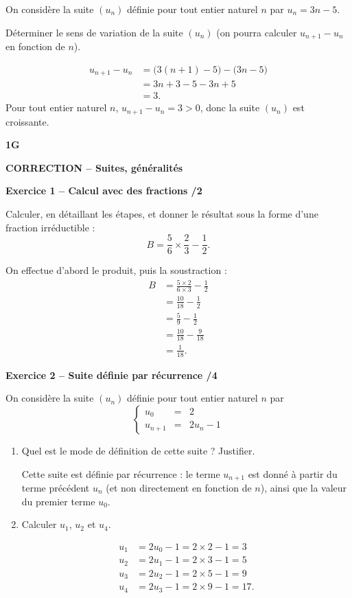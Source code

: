 \documentclass[10pt,a4paper]{article}
\renewcommand{\niveau}{1G}
\renewcommand{\chapitre}{Suites, généralités}
\renewcommand{\interroversion}[1]{
    \noindent\textbf{\niveau}

    \vspace{-0.5cm}
    \begin{center}
        \textbf{\large CORRECTION -- \chapitre}
    \end{center}

    \vspace{0.1cm}
}
\begin{document}
On considère la suite \((u_n)\) définie pour tout entier naturel \(n\) par \(u_n=3n-5\).

Déterminer le sens de variation de la suite \((u_n)\) (on pourra calculer \(u_{n+1}-u_n\) en fonction de \(n\)).

\[
\begin{aligned}
u_{n+1}-u_n &= \bigl(3(n+1)-5\bigr)-\bigl(3n-5\bigr)\\
            &= 3n+3-5-3n+5\\
            &= 3.
\end{aligned}
\]
Pour tout entier naturel \(n\), \(u_{n+1}-u_n=3>0\), donc la suite \((u_n)\) est croissante.

\newpage


\interroversion{B}

\textbf{Exercice 1 -- Calcul avec des fractions \hfill /2}

Calculer, en détaillant les étapes, et donner le résultat sous la forme d'une fraction irréductible :
\[
B = \frac{5}{6}\times\frac{2}{3}-\frac{1}{2}.
\]

On effectue d'abord le produit, puis la soustraction :
\[
\begin{aligned}
B &= \frac{5\times2}{6\times3}-\frac{1}{2}\\
  &= \frac{10}{18}-\frac{1}{2}\\
  &= \frac{5}{9}-\frac{1}{2}\\
  &= \frac{10}{18}-\frac{9}{18}\\
  &= \frac{1}{18}.
\end{aligned}
\]

\textbf{Exercice 2 -- Suite définie par récurrence \hfill /4}

On considère la suite \((u_n)\) définie pour tout entier naturel \(n\) par
\[
\left\{\begin{array}{rcl}
u_0 &=& 2 \\
u_{n+1} &=& 2u_n-1
\end{array}\right.
\]

\begin{enumerate}
\item Quel est le mode de définition de cette suite ? Justifier.

Cette suite est définie par récurrence : le terme \(u_{n+1}\) est donné à partir du terme précédent \(u_n\) (et non directement en fonction de \(n\)), ainsi que la valeur du premier terme \(u_0\).

\item Calculer \(u_1\), \(u_2\) et \(u_4\).

\[
\begin{aligned}
u_1 &= 2u_0-1 = 2\times2-1 = 3\\
u_2 &= 2u_1-1 = 2\times3-1 = 5\\
u_3 &= 2u_2-1 = 2\times5-1 = 9\\
u_4 &= 2u_3-1 = 2\times9-1 = 17.
\end{aligned}
\]
\end{enumerate}
\end{document}
